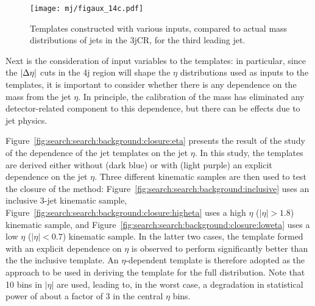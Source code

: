 
\begin{figure}
\centering
\texttt{[image: mj/figaux\_14c.pdf]}
\label{fig:search:search:background:3jCRThird}
\caption{Templates constructed with various inputs, compared to actual mass distributions of jets in the 3jCR, for the third leading jet.}
\end{figure}


Next is the consideration of input variables to the templates: in particular, since the $|\Delta\eta|$ cuts in the 4j region will shape the $\eta$ distributions used as inputs to the templates, it is important to consider whether there is any dependence on the mass from the jet $\eta$. In principle, the calibration of the mass has eliminated any detector-related component to this dependence, but there can be effects due to jet physics.


Figure~\ref{fig:search:search:background:closure:eta} presents the result of the study of the dependence of the jet templates on the jet $\eta$. In this study, the templates are derived either without (dark blue) or with (light purple) an explicit dependence on the jet $\eta$. Three different kinematic samples are then used to test the closure of the method: Figure~\ref{fig:search:search:background:inclusive} uses an inclusive 3-jet kinematic sample, Figure~\ref{fig:search:search:background:closure:higheta} uses a high $\eta$ ($|\eta|>1.8$) kinematic sample, and Figure~\ref{fig:search:search:background:closure:loweta} uses a low $\eta$ ($|\eta|<0.7$) kinematic sample. In the latter two cases, the template formed with an explicit dependence on $\eta$ is observed to perform significantly better than the the inclusive template. An $\eta$-dependent template is therefore adopted as the approach to be used in deriving the template for the full \MJ distribution. Note that 10 bins in $|\eta|$ are used, leading to, in the worst case, a degradation in statistical power of about a factor of 3 in the central $\eta$ bins.

